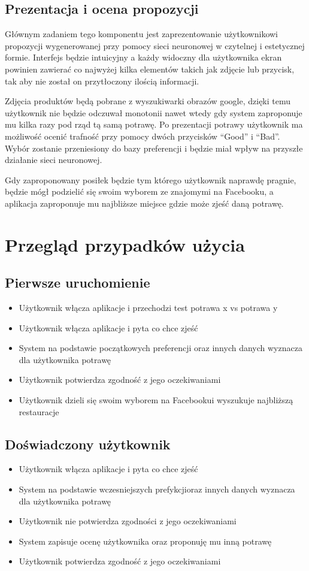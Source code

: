 \documentclass[a4paper,twoside,11pt]{article}
\begin{document}
\subsection{Prezentacja i ocena propozycji}
Głównym zadaniem tego komponentu jest zaprezentowanie użytkownikowi propozycji wygenerowanej przy pomocy sieci neuronowej w czytelnej i estetycznej formie. Interfejs będzie intuicyjny a każdy widoczny dla użytkownika ekran powinien zawierać co najwyżej kilka elementów takich jak zdjęcie lub przycisk, tak aby nie został on przytłoczony ilością informacji. 

Zdjęcia produktów będą pobrane z wyszukiwarki obrazów google, dzięki temu użytkownik nie będzie odczuwał monotonii nawet wtedy gdy system zaproponuje mu kilka razy pod rząd tą samą potrawę.
Po prezentacji potrawy użytkownik ma możliwość ocenić trafność przy pomocy dwóch przycisków “Good” i “Bad”. Wybór zostanie przeniesiony do bazy preferencji i będzie miał wpływ na przyszłe działanie sieci neuronowej.

Gdy zaproponowany posiłek będzie tym którego użytkownik naprawdę pragnie, będzie mógł podzielić się swoim wyborem ze znajomymi na Facebooku, a aplikacja zaproponuje mu najbliższe miejsce gdzie może zjeść daną potrawę.

\section{Przegląd przypadków użycia}

\subsection{Pierwsze uruchomienie}
\begin{itemize}
\item Użytkownik włącza aplikacje i przechodzi test potrawa x vs potrawa y
\item Użytkownik włącza aplikacje i pyta co chce zjeść
\item System na podstawie początkowych preferencji oraz innych danych wyznacza dla użytkownika potrawę
\item Użytkownik potwierdza zgodność z jego oczekiwaniami
\item Użytkownik dzieli się swoim wyborem na Facebookui wyszukuje najbliższą restauracje
\end{itemize}

\subsection{Doświadczony użytkownik}
\begin{itemize}
\item Użytkownik włącza aplikacje i pyta co chce zjeść
\item System na podstawie wczesniejszych prefykcjioraz innych danych wyznacza dla użytkownika potrawę
\item Użytkownik nie potwierdza zgodności z jego oczekiwaniami
\item System zapisuje ocenę użytkownika oraz proponuję mu inną potrawę
\item Użytkownik potwierdza zgodność z jego oczekiwaniami
\end{itemize}
\end{document}
